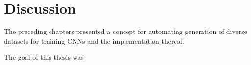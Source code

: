 \chapter{Discussion}
The preceding chapters presented a concept for automating generation of diverse datasets for training \acp{CNN} and the implementation thereof.

The goal of this thesis was 
